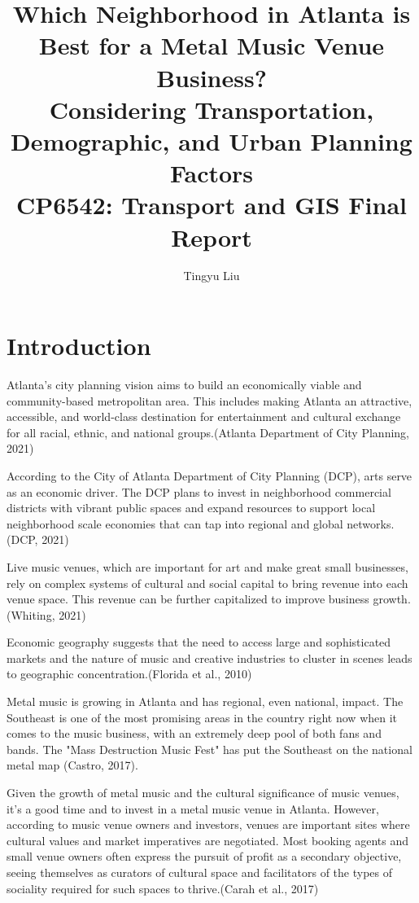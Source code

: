 \documentclass[11pt]{article}
\title{Which Neighborhood in Atlanta is Best for a Metal Music Venue Business? \\
Considering Transportation, Demographic, and Urban Planning Factors\\
\large CP6542: Transport and GIS Final Report\\
}
\author{Tingyu Liu}
\begin{document}
    

    
\section{Introduction}

Atlanta's city planning vision aims to build an economically viable and community-based metropolitan area. This includes making Atlanta an attractive, accessible, and world-class destination for entertainment and cultural exchange for all racial, ethnic, and national groups.(Atlanta Department of City Planning, 2021)

According to the City of Atlanta Department of City Planning (DCP), arts serve as an economic driver. The DCP plans to invest in neighborhood commercial districts with vibrant public spaces and expand resources to support local neighborhood scale economies that can tap into regional and global networks. (DCP, 2021)

Live music venues, which are important for art and make great small businesses, rely on complex systems of cultural and social capital to bring revenue into each venue space. This revenue can be further capitalized to improve business growth.(Whiting, 2021)

Economic geography suggests that the need to access large and sophisticated markets and the nature of music and creative industries to cluster in scenes leads to geographic concentration.(Florida et al., 2010)

Metal music is growing in Atlanta and has regional, even national, impact. The Southeast is one of the most promising areas in the country right now when it comes to the music business, with an extremely deep pool of both fans and bands. The "Mass Destruction Music Fest" has put the Southeast on the national metal map (Castro, 2017).

Given the growth of metal music and the cultural significance of music venues, it's a good time and  to invest in a metal music venue in Atlanta. However, according to music venue owners and investors, venues are important sites where cultural values and market imperatives are negotiated. Most booking agents and small venue owners often express the pursuit of profit as a secondary objective, seeing themselves as curators of cultural space and facilitators of the types of sociality required for such spaces to thrive.(Carah et al., 2017)
\end{document}
